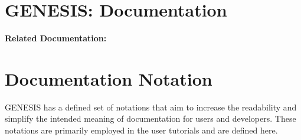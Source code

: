 \documentclass[12pt]{article}
\begin{document}
\section*{GENESIS: Documentation}

{\bf Related Documentation:}

\section*{Documentation Notation}

GENESIS has a defined set of notations that aim to increase the readability and simplify the intended meaning of documentation for users and developers. These notations are primarily employed in the user tutorials and are defined here.
\end{document}
